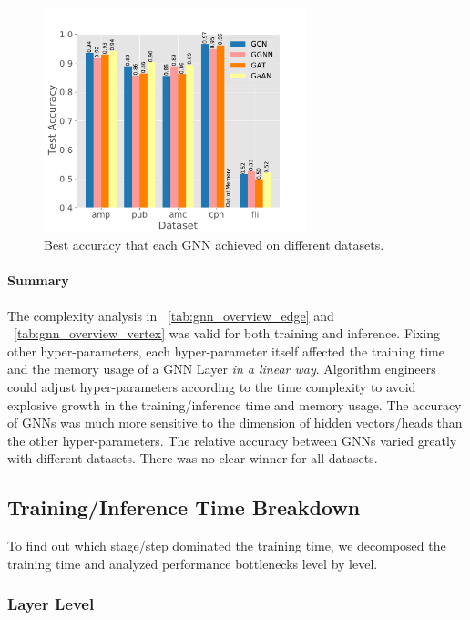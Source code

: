 \begin{figure}[H]
    \centering
    \includegraphics[width=3in]{figs/experiments/exp_hyperparameter_on_accuracy_alg_contrast.pdf}
    \caption{Best accuracy that each GNN achieved on different datasets.}
    \label{fig:exp_hyperparameter_on_accuracy_alg_contrast}
\end{figure}

\paragraph{Summary}

The complexity analysis in \tablename~\ref{tab:gnn_overview_edge} and \tablename~\ref{tab:gnn_overview_vertex} was valid for both training and inference.
%
Fixing other hyper-parameters, each hyper-parameter itself affected the training time and the memory usage of a GNN Layer \emph{in a linear way}.
%
Algorithm engineers could adjust hyper-parameters according to the time complexity to avoid explosive growth in the training/inference time and memory usage.
%
The accuracy of GNNs was much more sensitive to the dimension of hidden vectors/heads than the other hyper-parameters.
%
The relative accuracy between GNNs varied greatly with different datasets.
%
There was no clear winner for all datasets.

\subsection{Training/Inference Time Breakdown}
\label{sec:training_time_breakdown}

To find out which stage/step dominated the training time, we decomposed the training time and analyzed performance bottlenecks level by level.

\subsubsection{Layer Level}


